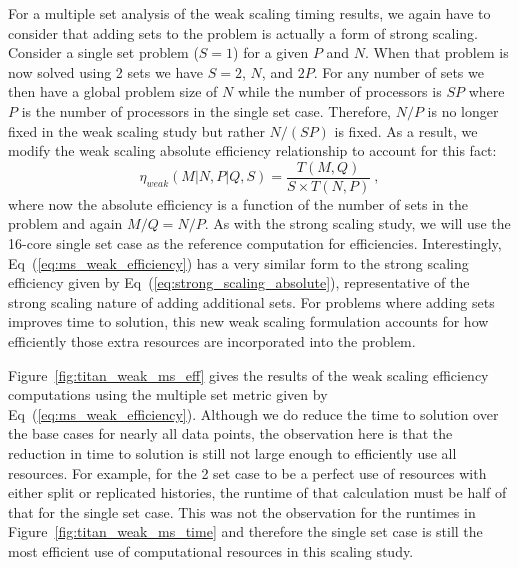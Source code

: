 For a multiple set analysis of the weak scaling timing results, we
again have to consider that adding sets to the problem is actually a
form of strong scaling. Consider a single set problem ($S=1$) for a
given $P$ and $N$. When that problem is now solved using 2 sets we
have $S=2$, $N$, and $2P$. For any number of sets we then have a
global problem size of $N$ while the number of processors is $SP$
where $P$ is the number of processors in the single set
case. Therefore, $N/P$ is no longer fixed in the weak scaling study
but rather $N/(SP)$ is fixed. As a result, we modify the weak scaling
absolute efficiency relationship to account for this fact:
\begin{equation}
\eta_{weak}(M|N,P|Q,S) = \frac{T(M,Q)}{S \times T(N,P)}\:,
  \label{eq:ms_weak_efficiency}
\end{equation}
where now the absolute efficiency is a function of the number of sets
in the problem and again $M/Q = N/P$. As with the strong scaling
study, we will use the 16-core single set case as the reference
computation for efficiencies. Interestingly,
Eq~(\ref{eq:ms_weak_efficiency}) has a very similar form to the strong
scaling efficiency given by Eq~(\ref{eq:strong_scaling_absolute}),
representative of the strong scaling nature of adding additional
sets. For problems where adding sets improves time to solution, this
new weak scaling formulation accounts for how efficiently those extra
resources are incorporated into the problem.

Figure~\ref{fig:titan_weak_ms_eff} gives the results of the weak
scaling efficiency computations using the multiple set metric given by
Eq~(\ref{eq:ms_weak_efficiency}). Although we do reduce the time to
solution over the base cases for nearly all data points, the
observation here is that the reduction in time to solution is still
not large enough to efficiently use all resources. For example, for
the 2 set case to be a perfect use of resources with either split or
replicated histories, the runtime of that calculation must be half of
that for the single set case. This was not the observation for the
runtimes in Figure~\ref{fig:titan_weak_ms_time} and therefore the
single set case is still the most efficient use of computational
resources in this scaling study.


